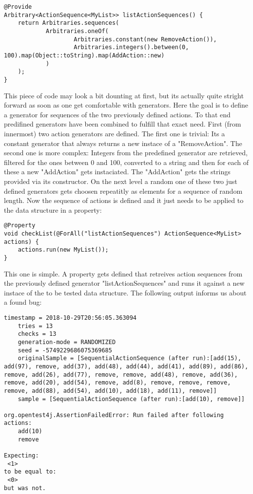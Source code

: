\documentclass[a4paper, 12pt]{article} %
\begin{document}
\begin{verbatim}
@Provide
Arbitrary<ActionSequence<MyList>> listActionSequences() {
    return Arbitraries.sequences(
            Arbitraries.oneOf(
                    Arbitraries.constant(new RemoveAction()),
                    Arbitraries.integers().between(0, 100).map(Object::toString).map(AddAction::new)
            )
    );
}
\end{verbatim} 

This piece of code may look a bit dounting at first, but its actually quite stright forward as soon as one get comfortable with generators. Here the goal is to define a generator for sequences of the two previously defined actions. To that end predifined generators have been combined to fulfill that exact need. First (from innermost) two action generators are defined. The first one is trivial: Its a constant generator that always returns a new instace of a "RemoveAction". The second one is more complex: Integers from the predefined generator are retrieved, filtered for the ones between 0 and 100, converted to a string and then for each of these a new "AddAction" gets instaciated. The "AddAction" gets the strings provided via its constructor. On the next level a random one of these two just defined generators gets choosen repeatitly as elements for a sequence of random length. Now the sequence of actions is defined and it just needs to be applied to the data structure in a property:

\begin{verbatim}
@Property
void checkList(@ForAll("listActionSequences") ActionSequence<MyList> actions) {
    actions.run(new MyList());
}
\end{verbatim} 

This one is simple. A property gets defined that retreives action sequences from the previously defined generator "listActionSequences" and runs it against a new instace of the to be tested data structure. The following output informs us about a found bug:

\begin{verbatim}
timestamp = 2018-10-29T20:56:05.363094
    tries = 13
    checks = 13
    generation-mode = RANDOMIZED
    seed = -5749229686075369685
    originalSample = [SequentialActionSequence (after run):[add(15), add(97), remove, add(37), add(48), add(44), add(41), add(89), add(86), remove, add(26), add(77), remove, remove, add(48), remove, add(36), remove, add(20), add(54), remove, add(8), remove, remove, remove, remove, add(88), add(54), add(10), add(18), add(11), remove]]
    sample = [SequentialActionSequence (after run):[add(10), remove]]

org.opentest4j.AssertionFailedError: Run failed after following actions:
    add(10)
    remove

Expecting:
 <1>
to be equal to:
 <0>
but was not.
\end{verbatim}
\end{document}
